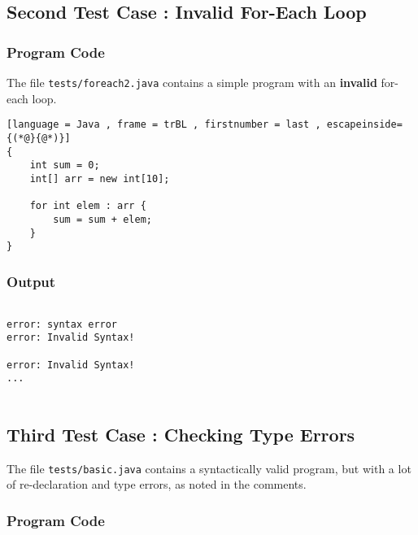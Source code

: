 \documentclass{article}
\begin{document}
\subsection{Second Test Case : Invalid For-Each Loop}

\subsubsection{Program Code}
The file \texttt{tests/foreach2.java} contains a simple program with an \textbf{invalid} for-each loop.
\begin{lstlisting}[language = Java , frame = trBL , firstnumber = last , escapeinside={(*@}{@*)}]
{
    int sum = 0;
    int[] arr = new int[10];
    
    for int elem : arr {
        sum = sum + elem;
    }
}

\end{lstlisting}

\subsubsection{Output}
\begin{lstlisting}

error: syntax error
error: Invalid Syntax!

error: Invalid Syntax!
...


\end{lstlisting}

\subsection{Third Test Case : Checking Type Errors}

The file \texttt{tests/basic.java} contains a syntactically valid program, but with a lot of re-declaration and type errors, as noted in the comments.

\subsubsection{Program Code}
\end{document}
